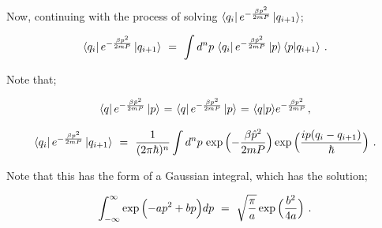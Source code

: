 \documentclass{article}
\begin{document}
Now, continuing with the process of solving \begin{math} \bra{q_i} e^{ - \frac{ \beta p^2}{2 m P}} \ket{q_{i+1}} \end{math}; 

\begin{equation} \label{eq:1}
\bra{q_i} e^{ - \frac{ \beta p^2}{2 m P}} \ket{q_{i+1}} \hspace{0.125cm} = \hspace{0.125cm} \int d^n p \hspace{0.05cm} \bra{q_i} e^{ - \frac{ \beta \hat{p}^2}{2 m P}} \ket{p} \langle p | q_{i+1} \rangle \hspace{0.125cm} .
\end{equation}

Note that;

\begin{equation} \label{eq:1}
\bra{q} e^{ - \frac{ \beta \hat{p}^2}{2 m P}} \ket{p} \hspace{0.025cm} = \hspace{0.025cm} \bra{q} e^{ - \frac{ \beta p^2}{2 m P}} \ket{p} \hspace{0.025cm} = \hspace{0.025cm} \langle q | p \rangle e^{ - \frac{ \beta p^2}{2 m P}} \hspace{0.025cm} ,
\end{equation}

\begin{equation} \label{eq:1}
\bra{q_i} e^{ - \frac{ \beta p^2}{2 m P}} \ket{q_{i+1}} \hspace{0.125cm} = \hspace{0.125cm} \frac{1}{(2 \pi \hbar)^{n}} \int d^n p \hspace{0.05cm} \exp\Big({ - \frac{ \beta \hat{p}^2}{2 m P}}\Big)  \exp\Big({\frac{i p (q_i - q_{i+1})}{\hbar}}\Big)  \hspace{0.125cm} .
\end{equation}

Note that this has the form of a Gaussian integral, which has the solution; 

\begin{equation} \label{eq:1}
\int_{- \infty}^{\infty} \exp\Big({ -a p^2 + b p}\Big) dp \hspace{0.125cm} = \hspace{0.125cm} \sqrt{\frac{\pi}{a}} \exp\Big({\frac{b^2}{4 a}}\Big) \hspace{0.125cm} .
\end{equation}
\end{document}
